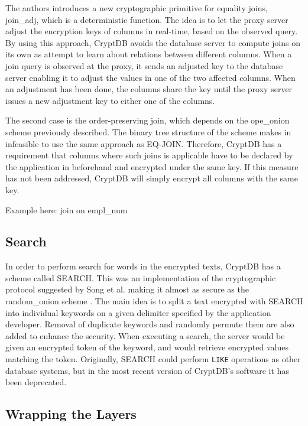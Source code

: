 The authors \citep{CryptDB_Main_Paper} introduces a new cryptographic primitive for equality joins, \gls{join_adj}, which is a deterministic function. The idea is to let the proxy server adjust the encryption keys of columns in real-time, based on the observed query. By using this approach, CryptDB avoids the database server to compute joins on its own as attempt to learn about relations between different columns. When a join query is observed at the proxy, it sends an adjusted key to the database server enabling it to adjust the values in one of the two affected columns. When an adjustment has been done, the columns share the key until the proxy server issues a new adjustment key to either one of the columns.

The second case is the order-preserving join, which depends on the \gls{ope_onion} scheme previously described. The binary tree structure of the scheme makes in infeasible to use the same approach as EQ-JOIN. Therefore, CryptDB has a requirement that columns where such joins is applicable have to be declared by the application in beforehand and encrypted under the same key. If this measure has not been addressed, CryptDB will simply encrypt all columns with the same key.


Example here: join on empl\_num

\subsection{Search}
In order to perform search for words in the encrypted texts, CryptDB has a scheme called SEARCH. This was an implementation of the cryptographic protocol suggested by Song et al. making it almost as secure as the \gls{random_onion} scheme \citep{CryptDB_Main_Paper}. The main idea is to split a text encrypted with SEARCH into individual keywords on a given delimiter specified by the application developer. Removal of duplicate keywords and randomly permute them are also added to enhance the security. When executing a search, the server would be given an encrypted token of the keyword, and would retrieve encrypted values matching the token. Originally, SEARCH could perform \texttt{LIKE} operations as other database systems, but in the most recent version of CryptDB's software it has been deprecated. 

\subsection{Wrapping the Layers}

